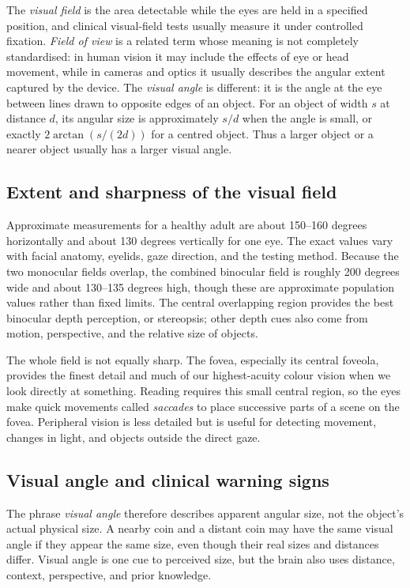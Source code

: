\documentclass[11pt,oneside]{report}
\begin{document}
The \emph{visual field} is the area detectable while the eyes are held in a
specified position, and clinical visual-field tests usually measure it under
controlled fixation. \emph{Field of view} is a related term whose meaning is
not completely standardised: in human vision it may include the effects of eye
or head movement, while in cameras and optics it usually describes the angular
extent captured by the device. The \emph{visual angle} is different: it is the
angle at the eye between lines drawn to opposite edges of an object. For an
object of width $s$ at distance $d$, its angular size is approximately $s/d$
when the angle is small, or exactly $2\arctan(s/(2d))$ for a centred object.
Thus a larger object or a nearer object usually has a larger visual angle.

\subsection*{Extent and sharpness of the visual field}

Approximate measurements for a healthy adult are about 150--160 degrees
horizontally and about 130 degrees vertically for one eye. The exact values
vary with facial anatomy, eyelids, gaze direction, and the testing method.
Because the two monocular fields overlap, the combined binocular field is
roughly 200 degrees wide and about 130--135 degrees high, though these are
approximate population values rather than fixed limits. The central overlapping
region provides the best binocular depth perception, or stereopsis; other depth
cues also come from motion, perspective, and the relative size of objects.

The whole field is not equally sharp. The fovea, especially its central
foveola, provides the finest detail and much of our highest-acuity colour vision
when we look directly at something. Reading requires this small central region,
so the eyes make quick movements called \emph{saccades} to place successive
parts of a scene on the fovea. Peripheral vision is less detailed but is useful
for detecting movement, changes in light, and objects outside the direct gaze.

\subsection*{Visual angle and clinical warning signs}

The phrase \emph{visual angle} therefore describes apparent angular size, not
the object's actual physical size. A nearby coin and a distant coin may have
the same visual angle if they appear the same size, even though their real sizes
and distances differ. Visual angle is one cue to perceived size, but the brain
also uses distance, context, perspective, and prior knowledge.
\end{document}
